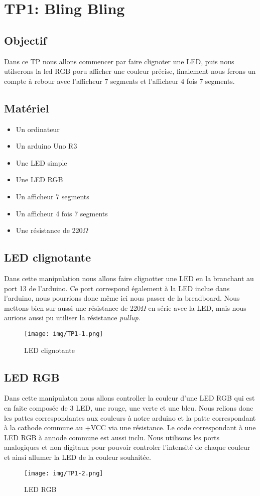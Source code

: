 \section{TP1: Bling Bling}
\subsection{Objectif}
Dans ce TP nous allons commencer par faire clignoter une LED, puis nous utilserons la led RGB poru afficher une couleur précise, finalement nous ferons un compte à rebour avec l'afficheur 7 segments et l'afficheur 4 fois 7 segments.

\subsection{Matériel}
\begin{itemize}
	\item Un ordinateur
	\item Un arduino Uno R3
	\item Une LED simple
	\item Une LED RGB
	\item Un afficheur 7 segments
	\item Un afficheur 4 fois 7 segments
	\item Une résistance de 220$\Omega$
\end{itemize}

\subsection{LED clignotante}
Dans cette manipulation nous allons faire clignotter une LED en la branchant au port 13 de l'arduino. Ce port correspond également à la LED inclue dans l'arduino, nous pourrions donc même ici nous passer de la breadboard. Nous mettons bien sur aussi une résistance de 220$\Omega$ en série avec la LED, mais nous aurions aussi pu utiliser la résistance \textit{pullup}.

\begin{figure}[H]
	\centering
	\texttt{[image: img/TP1-1.png]}
	\caption{\label{TP1.1}LED clignotante}
\end{figure}

\subsection{LED RGB}
Dans cette manipulaton nous allons controller la couleur d'une LED RGB qui est en faite composée de 3 LED, une rouge, une verte et une bleu. Nous relions donc les pattes correspondantes aux couleurs à notre arduino et la patte correspondant à la cathode commune au +VCC via une résistance\@. Le code correspondant à une LED RGB à annode commune est aussi inclu. Nous utilisons les ports analogiques et non digitaux pour pouvoir controler l'intensité de chaque couleur et ainsi allumer la LED de la couleur souhaitée.

\begin{figure}[H]
	\centering
	\texttt{[image: img/TP1-2.png]}
	\caption{\label{TP1.2}LED RGB}
\end{figure}

